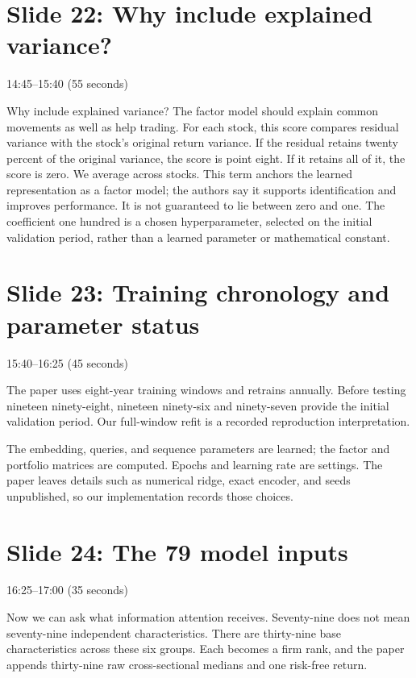 \documentclass[11pt]{article}
\begin{document}
\section*{Slide 22: Why include explained variance?}

\textcolor{SBred}{14:45--15:40 (55 seconds)}

Why include explained variance? The factor model should explain common movements as well as help trading. For each stock, this score compares residual variance with the stock's original return variance. If the residual retains twenty percent of the original variance, the score is point eight. If it retains all of it, the score is zero. We average across stocks. This term anchors the learned representation as a factor model; the authors say it supports identification and improves performance. It is not guaranteed to lie between zero and one. The coefficient one hundred is a chosen hyperparameter, selected on the initial validation period, rather than a learned parameter or mathematical constant.

\section*{Slide 23: Training chronology and parameter status}

\textcolor{SBred}{15:40--16:25 (45 seconds)}

The paper uses eight-year training windows and retrains annually. Before testing nineteen ninety-eight, nineteen ninety-six and ninety-seven provide the initial validation period. Our full-window refit is a recorded reproduction interpretation.

The embedding, queries, and sequence parameters are learned; the factor and portfolio matrices are computed. Epochs and learning rate are settings. The paper leaves details such as numerical ridge, exact encoder, and seeds unpublished, so our implementation records those choices.

\section*{Slide 24: The 79 model inputs}

\textcolor{SBred}{16:25--17:00 (35 seconds)}

Now we can ask what information attention receives. Seventy-nine does not mean seventy-nine independent characteristics. There are thirty-nine base characteristics across these six groups. Each becomes a firm rank, and the paper appends thirty-nine raw cross-sectional medians and one risk-free return.
\end{document}
